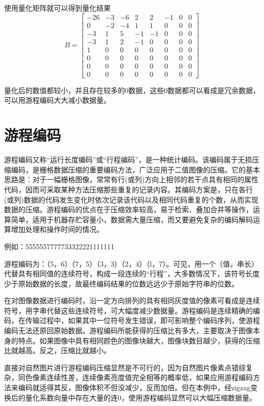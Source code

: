 使用量化矩阵就可以得到量化结果
\begin{equation}
    B=\begin{bmatrix}
    -26 & -3 & -6 & 2 & 2 & -1 & 0 & 0 \\
    0 & -2 & -4 & 1 & 1 & 0 & 0 & 0 \\
    -3 & 1 & 5 & -1 & -1 & 0 & 0 & 0 \\
    -3 & 1 & 2 & -1 & 0 & 0 & 0 & 0 \\
    1 & 0 & 0 & 0 & 0 & 0 & 0 & 0 \\
    0 & 0 & 0 & 0 & 0 & 0 & 0 & 0 \\
    0 & 0 & 0 & 0 & 0 & 0 & 0 & 0 \\
    0 & 0 & 0 & 0 & 0 & 0 & 0 & 0
    \end{bmatrix}
\end{equation}


量化后的数值都较小，并且存在较多的0数据，这些0数据都可以看成是冗余数据，可以用游程编码大大减小数据量。


\section{游程编码}
游程编码又称“运行长度编码”或“行程编码”，是一种统计编码。该编码属于无损压缩编码，是栅格数据压缩的重要编码方法，广泛应用于二值图像的压缩。它的基本思路是：对于一幅栅格图像，常常有行(或列)方向上相邻的若干点具有相同的属性代码，因而可采取某种方法压缩那些重复的记录内容。其编码方案是，只在各行(或列)数据的代码发生变化时依次记录该代码以及相同代码重复的个数，从而实现数据的压缩。游程编码的优点在于压缩效率较高，易于检索、叠加合并等操作，运算简单，适用于机器存贮容量小，数据需大量压缩，而又要避免复杂的编码解码运算增加处理和操作时间的情况。

例如：5555557777733322221111111

游程编码为：（5，6）（7，5）（3，3）（2，4）（l，7）。可见，用一个（值，串长）代替具有相同值的连续符号，构成一段连续的“行程”，大多数情况下，该符号长度少于原始数据的长度，故最终编码结果的位数远远少于原始字符串的位数。

在对图像数据进行编码时，沿一定方向排列的具有相同灰度值的像素可看成是连续符号，用字串代替这些连续符号，可大幅度减少数据量。游程编码是连续精确的编码，在传输过程中，如果其中一位符号发生错误，即可影响整个编码序列，使游程编码无法还原回原始数据。游程编码所能获得的压缩比有多大，主要取决于图像本身的特点。如果图像中具有相同颜色的图像块越大，图像块数目越少，获得的压缩比就越高。反之，压缩比就越小。

直接对自然图片进行游程编码压缩显然是不可行的，因为自然图片像素点错综复杂，同色像素连续性差，连续像素亮度值完全相等的概率低，如果应用游程编码方法来编码就适得其反，图像体积不但没减少，反而加倍。但在本例中，经zigzag变换后的量化系数向量中存在大量的连0，使用游程编码显然可以大幅压缩数据量。

